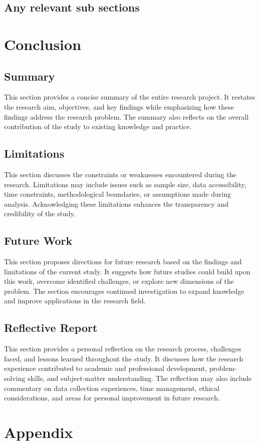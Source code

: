 \documentclass[12pt,a4paper]{report}
\begin{document}
\section{Any relevant sub sections}



\chapter{Conclusion}

\section{Summary}
This section provides a concise summary of the entire research project. 
It restates the research aim, objectives, and key findings while emphasizing how these findings address the research problem. 
The summary also reflects on the overall contribution of the study to existing knowledge and practice.

\section{Limitations}
This section discusses the constraints or weaknesses encountered during the research. 
Limitations may include issues such as sample size, data accessibility, time constraints, methodological boundaries, or assumptions made during analysis. 
Acknowledging these limitations enhances the transparency and credibility of the study.

\section{Future Work}
This section proposes directions for future research based on the findings and limitations of the current study. 
It suggests how future studies could build upon this work, overcome identified challenges, or explore new dimensions of the problem. 
The section encourages continued investigation to expand knowledge and improve applications in the research field.

\section{Reflective Report}
This section provides a personal reflection on the research process, challenges faced, and lessons learned throughout the study. 
It discusses how the research experience contributed to academic and professional development, problem-solving skills, and subject-matter understanding. 
The reflection may also include commentary on data collection experiences, time management, ethical considerations, and areas for personal improvement in future research.



\appendix
\chapter*{Appendix}
\end{document}
